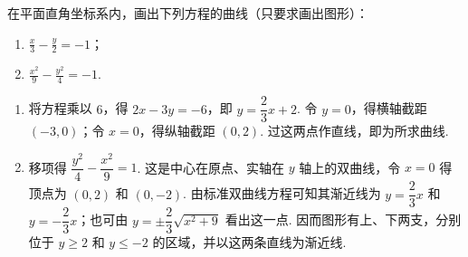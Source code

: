 \begin{problem}

在平面直角坐标系内，画出下列方程的曲线（只要求画出图形）：

\begin{enumerate}
\item \(\frac{x}{3} - \frac{y}{2} = -1\)；
\item \(\frac{x^2}{9} - \frac{y^2}{4} = -1\).
\end{enumerate}

\begin{solution}
\begin{enumerate}
\item 将方程乘以 \(6\)，得 \(2x-3y=-6\)，即 \(y=\dfrac{2}{3}x+2\). 令 \(y=0\)，得横轴截距 \((-3,0)\)；令 \(x=0\)，得纵轴截距 \((0,2)\). 过这两点作直线，即为所求曲线.
\item 移项得 \(\dfrac{y^2}{4}-\dfrac{x^2}{9}=1\). 这是中心在原点、实轴在 \(y\) 轴上的双曲线，令 \(x=0\) 得顶点为 \((0,2)\) 和 \((0,-2)\). 由标准双曲线方程可知其渐近线为 \(y=\dfrac{2}{3}x\) 和 \(y=-\dfrac{2}{3}x\)；也可由 \(y=\pm\dfrac{2}{3}\sqrt{x^2+9}\) 看出这一点. 因而图形有上、下两支，分别位于 \(y\geqslant2\) 和 \(y\leqslant-2\) 的区域，并以这两条直线为渐近线.
\end{enumerate}
\end{solution}
\end{problem}


